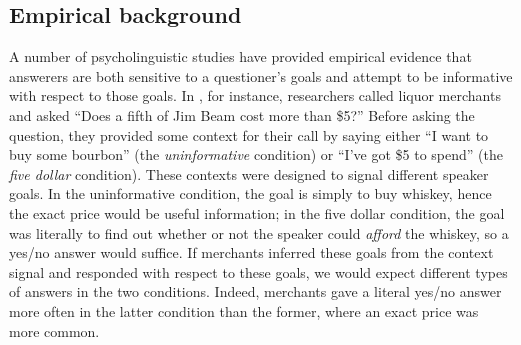 \documentclass[12pt, floatsintext, jou]{apa6}
\begin{document}

\subsection{Empirical background}

A number of psycholinguistic studies have provided empirical evidence that answerers are both sensitive to a questioner's goals and attempt to be informative with respect to those goals.
In , for instance, researchers called liquor merchants and asked ``Does a fifth of Jim Beam cost more than \$5?'' 
Before asking the question, they provided some context for their call by saying either ``I want to buy some bourbon'' (the \emph{uninformative} condition) or ``I've got \$5 to spend'' (the \emph{five dollar} condition). 
These contexts were designed to signal different speaker goals. 
In the uninformative condition, the goal is simply to buy whiskey, hence the exact price would be useful information; in the five dollar condition, the goal was literally to find out whether or not the speaker could \emph{afford} the whiskey, so a yes/no answer would suffice. 
If merchants inferred these goals from the context signal and responded with respect to these goals, we would expect different types of answers in the two conditions. 
Indeed, merchants gave a literal yes/no answer more often in the latter condition than the former, where an exact price was more common. 
\end{document}
